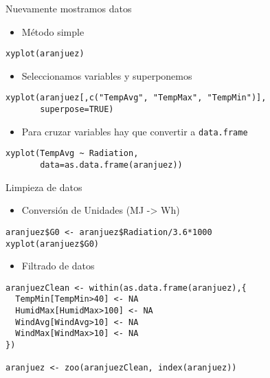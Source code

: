 \documentclass[xcolor={usenames,svgnames,dvipsnames}]{beamer}
\begin{document}
\begin{frame}[fragile,label=sec-2-4]{Nuevamente mostramos datos}
 \begin{itemize}
\item Método simple
\end{itemize}
\lstset{language=R,numbers=none}
\begin{lstlisting}
xyplot(aranjuez)
\end{lstlisting}
\begin{itemize}
\item Seleccionamos variables y superponemos
\end{itemize}
\lstset{language=R,numbers=none}
\begin{lstlisting}
xyplot(aranjuez[,c("TempAvg", "TempMax", "TempMin")],
       superpose=TRUE)
\end{lstlisting}
\begin{itemize}
\item Para cruzar variables hay que convertir a \texttt{data.frame}
\end{itemize}
\lstset{language=R,numbers=none}
\begin{lstlisting}
xyplot(TempAvg ~ Radiation,
       data=as.data.frame(aranjuez))
\end{lstlisting}
\end{frame}
\begin{frame}[fragile,label=sec-2-5]{Limpieza de datos}
 \begin{itemize}
\item Conversión de Unidades (MJ -> Wh)
\end{itemize}
\lstset{language=R,numbers=none}
\begin{lstlisting}
aranjuez$G0 <- aranjuez$Radiation/3.6*1000
xyplot(aranjuez$G0)
\end{lstlisting}
\begin{itemize}
\item Filtrado de datos
\end{itemize}
\lstset{language=R,numbers=none}
\begin{lstlisting}
aranjuezClean <- within(as.data.frame(aranjuez),{
  TempMin[TempMin>40] <- NA
  HumidMax[HumidMax>100] <- NA
  WindAvg[WindAvg>10] <- NA
  WindMax[WindMax>10] <- NA
})

aranjuez <- zoo(aranjuezClean, index(aranjuez))
\end{lstlisting}
\end{frame}
\end{document}
